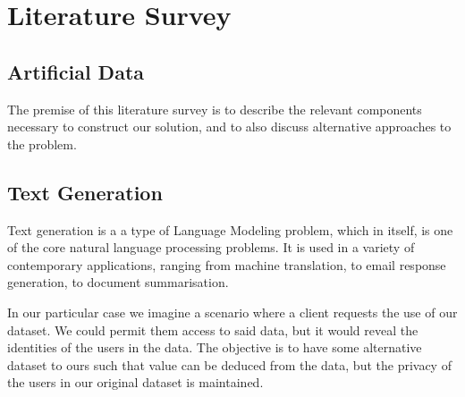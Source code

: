 \documentclass[12pt,twoside]{report}
\begin{document}
\chapter{Literature Survey}

\section{Artificial Data}

The premise of this literature survey is to describe the relevant components necessary to construct our solution, and to also discuss alternative approaches to the problem. 


\section{Text Generation}





Text generation is a a type of Language Modeling problem, which in itself, is one of the core natural language processing problems. It is used in a variety of contemporary applications, ranging from machine translation, to email response generation, to document summarisation.

In our particular case we imagine a scenario where a client requests the use of our dataset. We could permit them access to said data, but it would reveal the identities of the users in the data. The objective is to have some alternative dataset to ours such that value can be deduced from the data, but the privacy of the users in our original dataset is maintained.
\end{document}
